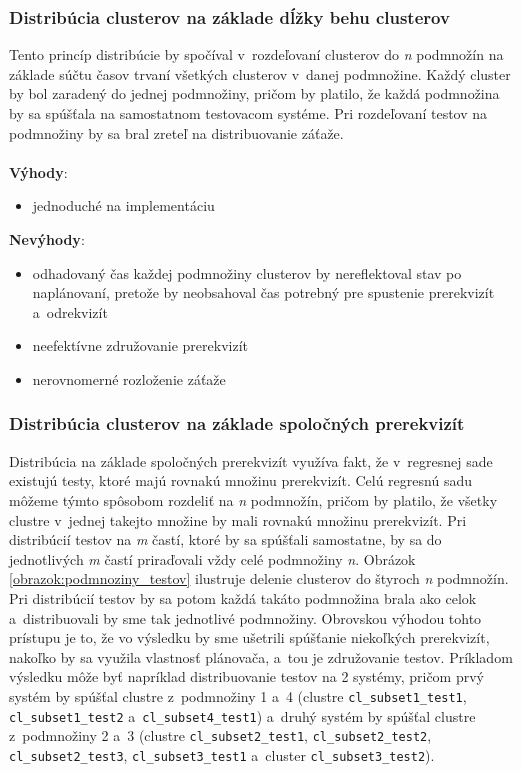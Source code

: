 \subsubsection*{Distribúcia clusterov na základe dĺžky behu clusterov}
Tento princíp distribúcie by spočíval v~rozdeľovaní clusterov do \textit{n} 
podmnožín na základe súčtu časov trvaní všetkých clusterov v~danej podmnožine. 
Každý cluster by bol zaradený do jednej podmnožiny, pričom by platilo,
že každá podmnožina by sa spúšťala na samostatnom testovacom systéme. 
Pri rozdeľovaní testov na podmnožiny by sa bral zreteľ na distribuovanie 
záťaže.
\\
\\
\noindent \textbf{Výhody}:
\begin{itemize}
\item jednoduché na implementáciu
\end{itemize} 

\noindent \textbf{Nevýhody}:
\begin{itemize}
\item odhadovaný čas každej podmnožiny clusterov by nereflektoval stav 
po naplánovaní, pretože by neobsahoval čas potrebný pre spustenie 
prerekvizít a~odrekvizít
\item neefektívne združovanie prerekvizít
\item nerovnomerné rozloženie záťaže
\end{itemize}

\subsubsection*{Distribúcia clusterov na základe spoločných prerekvizít}
Distribúcia na základe spoločných prerekvizít využíva fakt, že 
v~regresnej sade existujú testy, ktoré majú rovnakú množinu prerekvizít.
Celú regresnú sadu môžeme týmto spôsobom rozdeliť na \emph{n} podmnožín, 
pričom by platilo, že všetky clustre v~jednej takejto množine by mali
rovnakú množinu prerekvizít. Pri distribúcií testov na \emph{m} častí, 
ktoré by sa spúšťali samostatne, by sa do jednotlivých \emph{m} častí
priraďovali vždy celé podmnožiny \emph{n}. 
Obrázok \ref{obrazok:podmnoziny_testov} ilustruje delenie clusterov do 
štyroch \emph{n} podmnožín. Pri distribúcií testov by sa potom každá 
takáto podmnožina brala ako celok a~distribuovali by sme tak 
jednotlivé podmnožiny.
Obrovskou výhodou tohto prístupu je to, že vo výsledku by sme ušetrili 
spúšťanie niekoľkých prerekvizít, nakoľko by sa využila vlastnosť 
plánovača, a~tou je združovanie testov. Príkladom výsledku môže byť 
napríklad distribuovanie testov na 2 systémy, pričom prvý systém by 
spúšťal clustre z~podmnožiny 1 a~4 (clustre \texttt{cl\_subset1\_test1}, 
\texttt{cl\_subset1\_test2} a~\texttt{cl\_subset4\_test1})
a~druhý systém by spúšťal clustre z~podmnožiny 2 a~3 
(clustre \texttt{cl\_subset2\_test1}, \texttt{cl\_subset2\_test2}, 
\texttt{cl\_subset2\_test3}, \texttt{cl\_subset3\_test1} 
a~cluster \texttt{cl\_subset3\_test2}).

